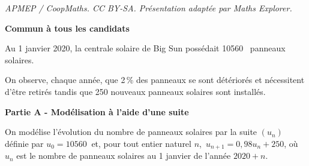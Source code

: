 \documentclass[10pt]{article}
\providecommand{\np}[2][]{{#2~#1}}
\begin{document}
\noindent\textit{APMEP / CoopMaths. CC BY-SA. Présentation adaptée par Maths Explorer.}\par\medskip
\textbf{Commun à tous les candidats}

\medskip

Au 1 janvier 2020, la centrale solaire de Big Sun possédait \np{10560} panneaux solaires.

On observe, chaque année, que 2\,\% des panneaux se sont détériorés et nécessitent d'être retirés tandis que 250 nouveaux panneaux solaires sont installés.

\bigskip

\textbf{Partie A - Modélisation à l'aide d'une suite}

\medskip

On modélise l'évolution du nombre de panneaux solaires par la suite $\left(u_n\right)$ définie par $u_0 = \np{10560}$ et, pour tout entier naturel $n$,\, $u_{n+1} = 0,98u_n +250$, où $u_n$  est le nombre de panneaux solaires au 1 janvier de l'année $2020 +n$.

\medskip
\end{document}
